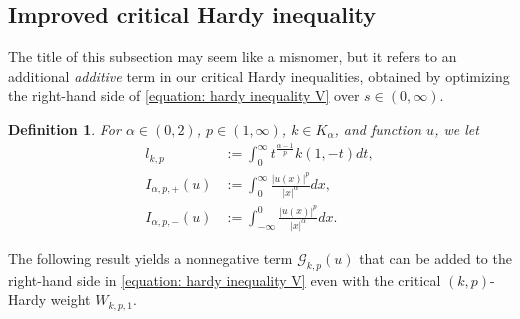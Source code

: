 \documentclass[12pt, a4paper]{amsart}
\newtheorem{definition}[theorem]{Definition}
\begin{document}
\subsection{Improved critical Hardy inequality}
The title of this subsection may seem like a misnomer, but it refers to an additional \textit{additive} term in our critical Hardy inequalities, obtained by optimizing the right-hand side of \eqref{equation: hardy inequality V} over $s \in (0,\infty)$. 
\begin{definition} For $\alpha \in (0, 2)$, $p \in (1, \infty)$,  $k \in K_\alpha$, and 
function $u$, we let
\begin{align*}
    l_{k, p} &:= \int_{0}^{\infty}t^{\frac{\alpha-1}{p}}k\left(1,-t\right)dt,
    \\
    I_{\alpha, p, +}(u) &:= \int_{0}^{\infty}\frac{|u(x)|^p}{|x|^{\alpha}}dx,
    \\
    I_{\alpha, p, -}(u) &:= \int_{-\infty}^{0}\frac{|u(x)|^p}{|x|^{\alpha}}dx.
\end{align*}
\end{definition}

The following result yields a nonnegative term $\mathcal{G}_{k,p}(u)$ that can be added to the right-hand side in \cref{equation: hardy inequality V} even with the critical $(k,p)$-Hardy weight $W_{k,p,1}$.
\end{document}
